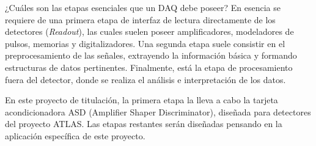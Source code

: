 


¿Cuáles son las etapas esenciales que un DAQ debe poseer? En esencia se requiere de una primera etapa de interfaz de lectura directamente de los detectores (\textit{Readout}), las cuales suelen poseer amplificadores, modeladores de pulsos, memorias y digitalizadores. Una segunda etapa suele consistir en el preprocesamiento de las señales, extrayendo la información básica y formando estructuras de datos pertinentes. Finalmente, está la etapa de procesamiento fuera del detector, donde se realiza el análisis e interpretación de los datos.

En este proyecto de titulación, la primera etapa la lleva a cabo la tarjeta acondicionadora ASD (Amplifier Shaper Discriminator), diseñada para detectores del proyecto ATLAS. Las etapas restantes serán diseñadas pensando en la aplicación específica de este proyecto.

